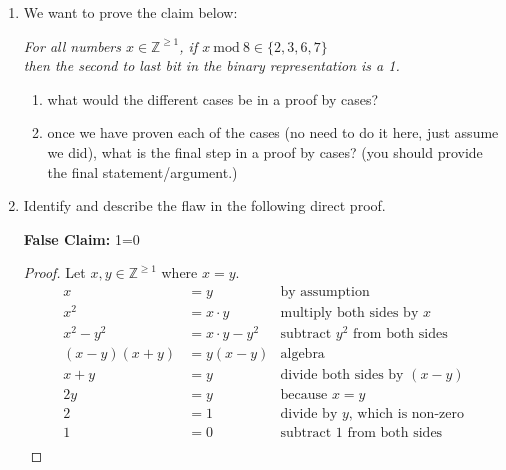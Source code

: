 \documentclass[11pt, oneside]{article}   	%
\newcommand{\ints}{\mathbb{Z}}
\renewcommand{\mod}{\ \mathrm{mod}\ }
\begin{document}
\begin{enumerate}
\clearpage
\item We want to prove the claim below:
\begin{center}
\textit{For all numbers $x\in\ints^{\ge1}$, if $x\mod 8 \in\{2,3,6,7\}$ \\
then the second to last bit in the binary representation is a 1.}
\end{center}
\begin{enumerate}
\item what would the different cases be in a proof by cases? \vspace{8em}
\item once we have proven each of the cases (no need to do it here, just assume we did), 
what is the final step in a proof by cases? (you should provide the final statement/argument.)\vspace{8em}
\end{enumerate}

\item Identify and describe the flaw in the following direct proof. 

\textbf{False Claim:} 1=0

\begin{proof}
Let $x, y \in \ints^{\ge1}$ where $x=y$.
\[
\begin{aligned}
x &= y & \text{by assumption}\\
x^2 &= x\cdot y & \text{multiply both sides by $x$}\\
x^2 - y^2 &= x\cdot y - y^2 & \text{subtract $y^2$ from both sides}\\ 
\left(x-y\right)\left(x+y\right) &= y \left(x-y\right) & \text{algebra}\\
x + y &= y & \text{divide both sides by $(x-y)$}\\
2 y &= y & \text{because $x=y$}\\
2 &= 1 & \text{divide by $y$, which is non-zero}\\
1 &= 0 & \text{subtract 1 from both sides}\\
\end{aligned}
\]
\end{proof}
\vspace{5em}

\end{enumerate}
\end{document}
